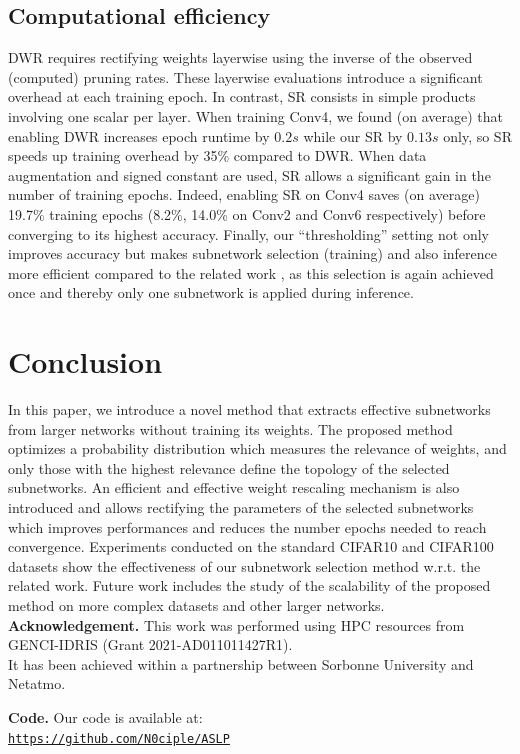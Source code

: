   \subsection{Computational efficiency}
  \label{sec:SR-impact}
DWR requires rectifying weights layerwise using the inverse of the observed
(computed) pruning rates. These layerwise evaluations introduce a significant
overhead at each training epoch. In contrast, \ac{SR} consists in simple products
involving one scalar per layer. When training Conv4, we found (on average) that
enabling DWR increases epoch runtime by $0.2s$ while our \ac{SR} by $0.13s$ only, so
SR speeds up training overhead by 35\% compared to DWR.  When data augmentation
and signed constant are used, \ac{SR} allows a significant gain in the number of
training epochs. Indeed, enabling \ac{SR} on Conv4  saves (on average) 19.7\%
training epochs (8.2\%, 14.0\%  on Conv2 and Conv6 respectively) before
converging to its highest accuracy. Finally, our ``thresholding'' setting not
only improves accuracy but makes subnetwork selection (training) and also
inference more efficient compared to the related work
\cite{DBLP:conf/nips/ZhouLLY19,DBLP:conf/cvpr/RamanujanWKFR20},  as this
selection is again achieved  once and thereby only one subnetwork is applied
during inference.
 

\section{Conclusion}

In this paper, we introduce a novel method that extracts effective subnetworks
from larger networks without training its weights. The proposed method optimizes
a probability distribution which measures the relevance of weights, and only
those with the highest relevance define the topology of the selected
subnetworks. An efficient and effective weight rescaling mechanism is also
introduced and allows rectifying the parameters of the selected subnetworks
which improves performances and reduces the number epochs needed to reach
convergence. Experiments conducted on the standard CIFAR10 and  CIFAR100
datasets show the effectiveness of our subnetwork selection method w.r.t. the
related work. Future work includes the study of the scalability of the proposed
method on more complex datasets and other larger networks.\\

\noindent\textbf{Acknowledgement.} 
This work was performed using HPC resources from GENCI-IDRIS (Grant 2021-AD011011427R1). \\
It has been achieved within a partnership between Sorbonne University and Netatmo.

\noindent\textbf{Code.} Our code is available at:\\ \href{https://github.com/N0ciple/ASLP}{\texttt{https://github.com/N0ciple/ASLP}}